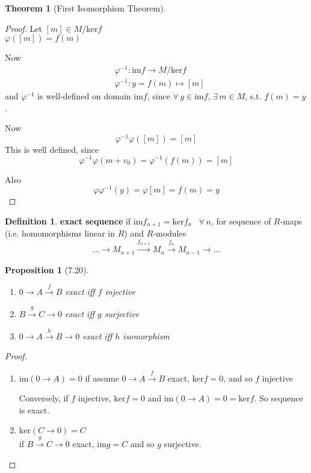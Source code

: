 \documentclass[twoside,landscape]{amsart}
\theoremstyle{plain}
\newtheorem{theorem}{Theorem}
\newtheorem{proposition}{Proposition}
\theoremstyle{definition}
\newtheorem{definition}{Definition}
\theoremstyle{remark}
\begin{document}
\begin{multicols*}{2}
\begin{theorem}[First Isomorphism Theorem]
\end{theorem}

\begin{proof}
Let $[m] \in M/\text{ker}{f}$ \\
\phantom{Let } $\varphi([m]) = f(m)$

Now 
\[
\begin{aligned}
  & \varphi^{-1} : \text{im}f \to M/\text{ker}f \\ 
  & \varphi^{-1}: y = f(m) \mapsto [m]
\end{aligned}
\]
and $\varphi^{-1}$ is well-defined on domain $\text{im}{f}$, since $\forall \, y \in \text{im}{f}$, $\exists \, m \in M$, s.t. $f(m)=y$.  

Now
\[
\varphi^{-1}\varphi([m]) = [m]
\]
This is well defined, since 
\[
\varphi^{-1}\varphi(m+v_0) = \varphi^{-1}(f(m)) = [m]
\]

Also
\[
\varphi \varphi^{-1}(y) = \varphi[m] = f(m) = y
\]
\end{proof}

\begin{definition}
  \textbf{exact sequence} if $\text{im}f_{n+1} = \text{ker}f_n$ \, $\forall \, n$, for sequence of $R$-maps (i.e. homomorphisms linear in $R$) and $R$-modules 
\[
\dots \to M_{n+1} \xrightarrow{ f_{n+1}} M_n \xrightarrow{ f_n} M_{n-1} \to \dots
\]
\end{definition}

\begin{proposition}[7.20]
  \begin{enumerate}
    \item[(i)] $0 \to A \xrightarrow{f} B$ exact iff $f$ injective 
    \item[(ii)] $B \xrightarrow{g} C \to 0$ exact iff $g$ surjective 
    \item[(iii)] $0 \to A \xrightarrow{h} B \to 0$ exact iff $h$ isomorphism
\end{enumerate}
\end{proposition}

\begin{proof}
  \begin{enumerate}
    \item[(i)] $\text{im}(0\to A) =0$ 
if assume $0 \to A \xrightarrow{f} B$ exact, $\text{ker}{f} =0$, and so $f$ injective

Conversely, if $f$ injective, $\text{ker}f=0$ and $\text{im}(0\to A)=0 = \text{ker}f$.  So sequence is exact.  
    \item[(ii)] $\text{ker}(C\to 0) = C$ \\
if $B\xrightarrow{g} C \to 0$ exact, $\text{im}g = C$ and so $g$ surjective.  


\end{enumerate}
\end{proof}
\end{multicols*}
\end{document}
